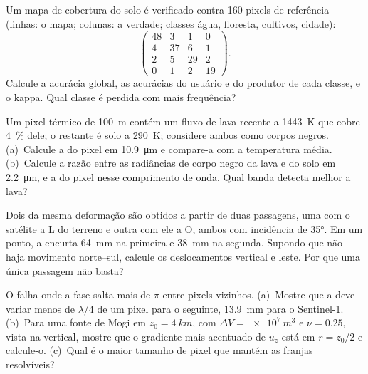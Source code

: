 \begin{exercise}[$\star\star$]\label{exo:b3:remote-sensing-gis:8}
Um mapa de cobertura do solo é verificado contra 160 pixels de referência (linhas: o mapa;
colunas: a verdade; classes água, floresta, cultivos, cidade):
\[
\begin{pmatrix} 48 & 3 & 1 & 0 \\ 4 & 37 & 6 & 1 \\ 2 & 5 & 29 & 2 \\ 0 & 1 & 2 & 19 \end{pmatrix} .
\]
Calcule a acurácia global, as acurácias do usuário e do produtor de cada
classe, e o kappa. Qual classe é perdida com mais frequência?
\end{exercise}

\begin{exercise}[$\star\star$]\label{exo:b3:remote-sensing-gis:9}
Um pixel térmico de \qty{100}{m} contém um fluxo de lava recente a \qty{1443}{K}
que cobre \qty{4}{\percent} dele; o restante é solo a \qty{290}{K}; considere
ambos como corpos negros. (a)~Calcule a  do pixel
em \qty{10.9}{\micro\metre} e compare-a com a temperatura média.
(b)~Calcule a razão entre as radiâncias de corpo negro da lava e do
solo em \qty{2.2}{\micro\metre}, e a  do
pixel nesse comprimento de onda. Qual banda detecta melhor a lava?
\end{exercise}

\begin{exercise}[$\star\star\star$]\label{exo:b3:remote-sensing-gis:10}
Dois  da mesma deformação são obtidos a partir de duas passagens, uma
com o satélite a L do terreno e outra com ele a O,
ambos com incidência de \ang{35}. Em um ponto, a
 encurta \qty{64}{mm} na primeira e \qty{38}{mm} na
segunda. Supondo que não haja movimento norte--sul, calcule os deslocamentos vertical e
leste. Por que uma única passagem não basta?
\end{exercise}

\begin{exercise}[$\star\star\star$]\label{exo:b3:remote-sensing-gis:11}
O  falha onde a fase salta mais de $\pi$ entre
pixels vizinhos. (a)~Mostre que a  deve variar menos de
$\lambda/4$ de um pixel para o seguinte, \qty{13.9}{mm} para
o Sentinel-1. (b)~Para uma fonte de Mogi em $z_0 = \qty{4}{km}$, com $\Delta V =
\qty{e7}{m^3}$ e $\nu = 0.25$, vista na vertical, mostre que o gradiente mais acentuado
de $u_z$ está em $r = z_0/2$ e calcule-o. (c)~Qual é o maior tamanho de pixel que
mantém as franjas resolvíveis?
\end{exercise}


